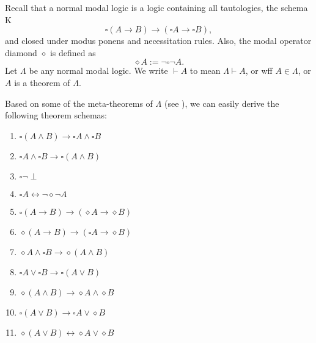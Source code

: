 \documentclass[12pt]{article}
\begin{document}
Recall that a normal modal logic is a logic containing all tautologies, the schema K
$$\square (A\to B) \to (\square A \to \square B),$$
and closed under modus ponens and necessitation rules.  Also, the modal operator diamond $\diamond$ is defined as $$\diamond A:=\neg \square \neg A.$$
Let $\Lambda$ be any normal modal logic.  We write $\vdash A$ to mean $\Lambda \vdash A$, or wff $A\in \Lambda$, or $A$ is a theorem of $\Lambda$.

Based on some of the meta-theorems of $\Lambda$ (see ), we can easily derive the following theorem schemas:
\begin{multicols}{2}{
\begin{enumerate}
\item $\square (A\land B)\to \square A \land \square B$
\item $\square A \land \square B \to \square (A\land B)$
\item $\square \neg \perp$
\item $\square A \leftrightarrow \neg \diamond \neg A$
\item $\square (A\to B) \to (\diamond A \to \diamond B)$
\item $\diamond (A\to B)\to (\square A \to \diamond B)$
\item $\diamond A \land \square B \to \diamond(A\land B)$
\item $\square A \lor \square B \to \square (A\lor B)$
\item $\diamond (A\land B)\to \diamond A\land \diamond B$
\item $\square (A \lor B)\to \square A \lor \diamond B$
\item $\diamond (A\lor B) \leftrightarrow \diamond A \lor \diamond B$
\end{enumerate}
}\end{multicols}
\end{document}
